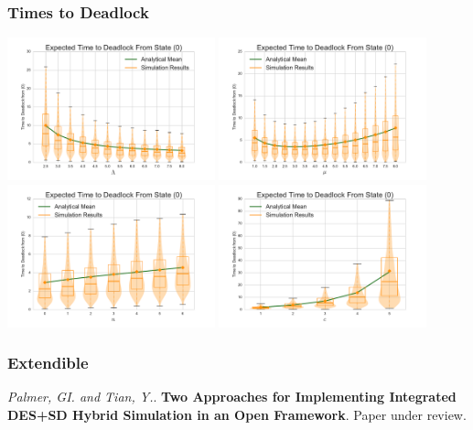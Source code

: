 \documentclass[xcolor={table}]{beamer}
\begin{document}
\begin{frame}
    \frametitle{Times to Deadlock}
    \centering
    \includegraphics[width=0.45\textwidth]{../images/varyL_1Nms}
    \includegraphics[width=0.45\textwidth]{../images/varymu_1Nms}\newline
    \includegraphics[width=0.45\textwidth]{../images/varyn_1Nms}
    \includegraphics[width=0.45\textwidth]{../images/varyc_1Nms}
\end{frame}

\begin{frame}
\frametitle{Extendible}
\end{frame}

\begin{frame}
\begin{center}

\end{center}
\scriptsize{\textcolor{textorange}{\textit{Palmer, GI. and Tian, Y.}. \textbf{Two Approaches for Implementing Integrated DES+SD Hybrid Simulation in an Open Framework}. Paper under review.}}
\end{frame}
\end{document}
